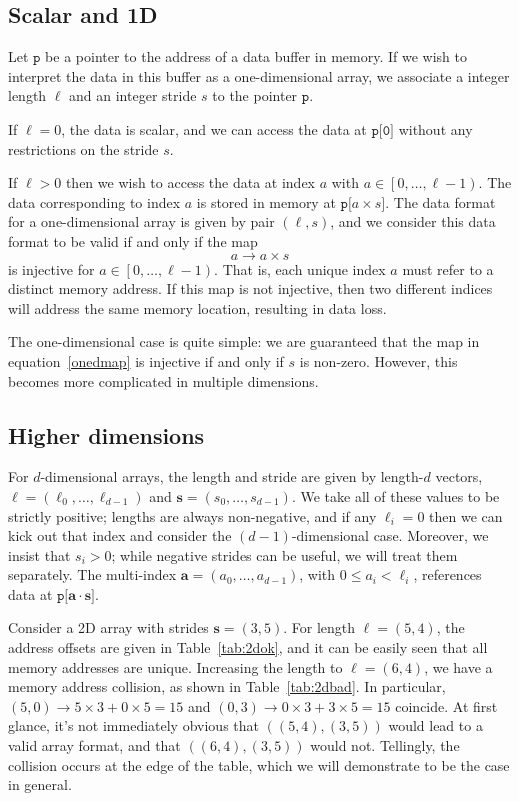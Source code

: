 \documentclass[twocolumn,10pt,notitlepage]{article}
\begin{document}
\subsection{Scalar and 1D}
Let $\texttt{p}$ be a pointer to the address of a data buffer in
memory. If we wish to interpret the data in this buffer as a
one-dimensional array, we associate a integer length $\ell$ and an
integer stride $s$ to the pointer $\texttt{p}$.

If $\ell=0$, the data is scalar, and we can access the data at
$\texttt{p[0]}$ without any restrictions on the stride $s$.  

If $\ell>0$ then we wish to access the data at index $a$ with
$a\in\left[0,\dots,\ell-1\right)$.  The data corresponding to index
  $a$ is stored in memory at $\texttt{p[}a \times{} s\texttt{]}$.  The
  data format for a one-dimensional array is given by pair
  $\left(\ell, s\right)$, and we consider this data format to be valid
  if and only if the map
\begin{dmath}
  \label{onedmap}
  a \rightarrow a \times s
\end{dmath}
is injective for $a\in\left[0,\dots,\ell-1\right)$.  That is, each
  unique index $a$ must refer to a distinct memory address.  If this
  map is not injective, then two different indices will address the
  same memory location, resulting in data loss.
  
The one-dimensional case is quite simple: we are guaranteed that the
map in equation~\eqref{onedmap} is injective if and only if $s$ is
non-zero.  However, this becomes more complicated in multiple
dimensions.


\subsection{Higher dimensions}
For $d$-dimensional arrays, the length and stride are given by
length-$d$ vectors, $\bm{\ell}=\left(\ell_0, \dots, \ell_{d-1}\right)$
and $\bm{s}=\left(s_0, \dots, s_{d-1}\right)$.  We take all of these
values to be strictly positive; lengths are always non-negative, and
if any $\ell_i=0$ then we can kick out that index and consider the
$(d-1)$-dimensional case.  Moreover, we insist that $s_i>0$; while
negative strides can be useful, we will treat them separately.  The
multi-index $\bm{a}=\left(a_0,\dots,a_{d-1}\right)$, with
$0\leq{}a_i<\ell_i$, references data at
$\texttt{p[}\bm{a}\cdot{}\bm{s}\texttt{]}$.

Consider a 2D array with strides $\bm{s}=(3,5)$.  For length
$\bm{\ell}=\left(5,4\right)$, the address offsets are given in
Table~\ref{tab:2dok}, and it can be easily seen that all memory
addresses are unique.  Increasing the length to
$\bm{\ell}=\left(6,4\right)$, we have a memory address collision, as
shown in Table~\ref{tab:2dbad}.  In particular,
$(5,0)\rightarrow{}5\times{}3 + 0 \times{}5=15$ and
$(0,3)\rightarrow{}0\times{}3 + 3 \times{}5=15$ coincide. At first
glance, it's not immediately obvious that $\left((5,4),(3,5)\right)$
would lead to a valid array format, and that
$\left((6,4),(3,5)\right)$ would not.  Tellingly, the collision occurs
at the edge of the table, which we will demonstrate to be the case in
general.
\end{document}
